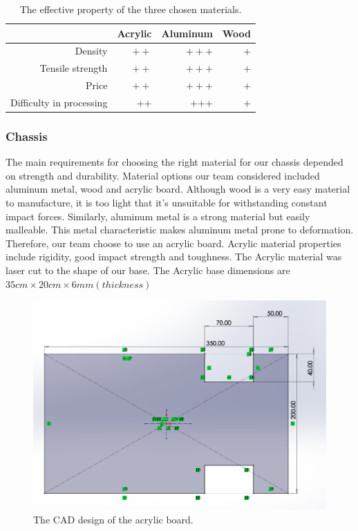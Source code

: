 \documentclass{article}
\begin{document}
\begin{table}[H]
\centering
\begin{tabular}{r|rrr}
           &    Acrylic &   Aluminum &       Wood \\
\hline
   Density &        $++$ &        $+++$ &      $+$ \\

Tensile strength &         $++$ &         $+++$ &         $+$ \\

     Price &        $++$ &        $+++$ &        $+$ \\

Difficulty in processing &          ++ &          +++ &          + \\
\end{tabular} 
\caption{The effective property of the three chosen materials.}

\end{table}
 


\subsubsection*{Chassis}
The main requirements for choosing the right material for our chassis depended on strength and durability. Material options our team considered included aluminum metal, wood and acrylic board. Although wood is a very easy material to manufacture, it is too light that it's unsuitable for withstanding constant impact forces. Similarly, aluminum metal is a strong material but easily malleable. This metal characteristic makes aluminum metal prone to deformation. Therefore, our team choose to use an acrylic board. Acrylic material properties include rigidity, good impact strength and toughness. The Acrylic material was laser cut to the shape of our base.  The Acrylic base dimensions are $35cm\times 20cm\times 6mm (thickness) $

\begin{figure}[H]
\centering
\includegraphics[width=0.6\linewidth]{board1}
\caption{The CAD design of the acrylic board.}
\end{figure}
\end{document}

